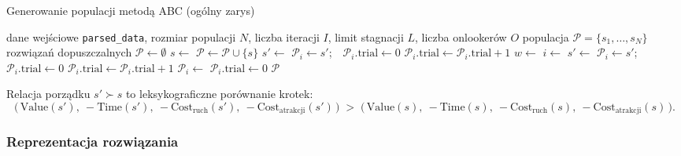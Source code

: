\begin{algorithm}[H]
\caption{Generowanie populacji metodą ABC (ogólny zarys)}
\label{alg:abc-overview}
\begin{algorithmic}[1]
\Require dane wejściowe \texttt{parsed\_data}, rozmiar populacji $N$, liczba iteracji $I$, limit stagnacji $L$, liczba onlookerów $O$
\Ensure populacja $\mathcal{P} = \{s_1, \dots, s_N\}$ rozwiązań dopuszczalnych
\State $\mathcal{P} \gets \emptyset$
    \State $s \gets$ 
        \State $\mathcal{P} \gets \mathcal{P} \cup \{s\}$
    \EndIf
\EndWhile
{}
     
        \State $s' \gets$ 
            \State $\mathcal{P}_i \gets s'$;\ \  $\mathcal{P}_i.\text{trial} \gets 0$
        \Else
            \State $\mathcal{P}_i.\text{trial} \gets \mathcal{P}_i.\text{trial} + 1$
        \EndIf
    \EndFor
    \State $w \gets$ 
     
        \State $i \gets$ 
        \State $s' \gets$ 
            \State $\mathcal{P}_i \gets s'$;\ \  $\mathcal{P}_i.\text{trial} \gets 0$
        \Else
            \State $\mathcal{P}_i.\text{trial} \gets \mathcal{P}_i.\text{trial} + 1$
        \EndIf
    \EndFor
     
            \State $\mathcal{P}_i \gets$ 
            \State $\mathcal{P}_i.\text{trial} \gets 0$
        \EndIf
    \EndFor
\EndFor
\State \Return $\mathcal{P}$
\end{algorithmic}
\end{algorithm}

Relacja porządku $s' \succ s$ to leksykograficzne porównanie krotek:
\[
\big(\,\mathrm{Value}(s'),\ -\mathrm{Time}(s'),\ -\mathrm{Cost}_{\mathrm{ruch}}(s'),\ -\mathrm{Cost}_{\mathrm{atrakcji}}(s')\,\big)
\;>\;
\big(\,\mathrm{Value}(s),\ -\mathrm{Time}(s),\ -\mathrm{Cost}_{\mathrm{ruch}}(s),\ -\mathrm{Cost}_{\mathrm{atrakcji}}(s)\,\big).
\]

\subsubsection{Reprezentacja rozwiązania}
\label{sec:repr}

